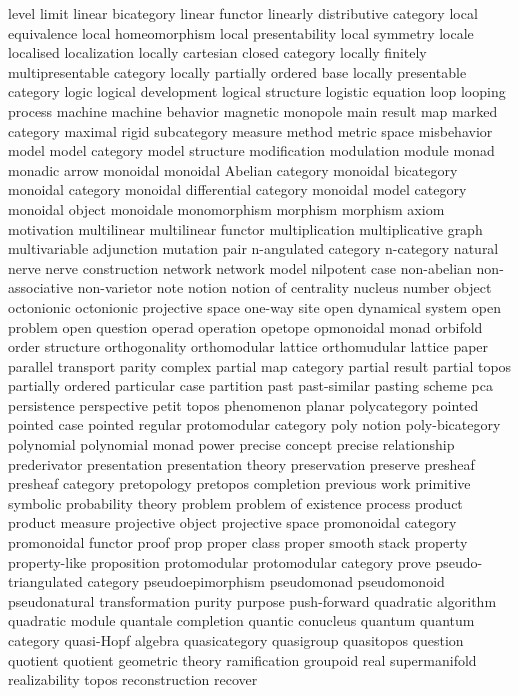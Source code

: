 level
limit
linear bicategory
linear functor
linearly distributive category
local equivalence
local homeomorphism
local presentability
local symmetry
locale
localised
localization
locally cartesian closed category
locally finitely multipresentable category
locally partially ordered base
locally presentable category
logic
logical development
logical structure
logistic equation
loop
looping process
machine
machine behavior
magnetic monopole
main result
map
marked category
maximal rigid subcategory
measure
method
metric space
misbehavior
model
model category
model structure
modification
modulation
module
monad
monadic arrow
monoidal
monoidal Abelian category
monoidal bicategory
monoidal category
monoidal differential category
monoidal model category
monoidal object
monoidale
monomorphism
morphism
morphism axiom
motivation
multilinear
multilinear functor
multiplication
multiplicative graph
multivariable adjunction
mutation pair
n-angulated category
n-category
natural
nerve
nerve construction
network
network model
nilpotent case
non-abelian
non-associative
non-varietor
note
notion
notion of centrality
nucleus
number
object
octonionic
octonionic projective space
one-way site
open dynamical system
open problem
open question
operad
operation
opetope
opmonoidal monad
orbifold
order structure
orthogonality
orthomodular lattice
orthomudular lattice
paper
parallel transport
parity complex
partial map category
partial result
partial topos
partially ordered
particular case
partition
past
past-similar
pasting scheme
pca
persistence
perspective
petit topos
phenomenon
planar polycategory
pointed
pointed case
pointed regular protomodular category
poly notion
poly-bicategory
polynomial
polynomial monad
power
precise concept
precise relationship
prederivator
presentation
presentation theory
preservation
preserve
presheaf
presheaf category
pretopology
pretopos completion
previous work
primitive symbolic
probability theory
problem
problem of existence
process
product
product measure
projective object
projective space
promonoidal category
promonoidal functor
proof
prop
proper class
proper smooth stack
property
property-like
proposition
protomodular
protomodular category
prove
pseudo-triangulated category
pseudoepimorphism
pseudomonad
pseudomonoid
pseudonatural transformation
purity
purpose
push-forward
quadratic algorithm
quadratic module
quantale completion
quantic conucleus
quantum
quantum category
quasi-Hopf algebra
quasicategory
quasigroup
quasitopos
question
quotient
quotient geometric theory
ramification groupoid
real supermanifold
realizability topos
reconstruction
recover
